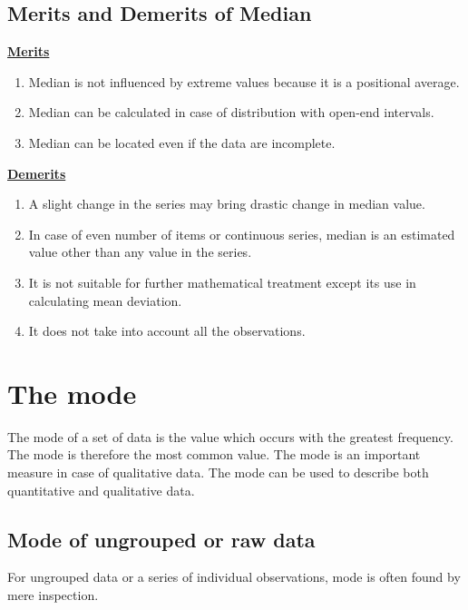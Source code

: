 \documentclass[
]{book}
\begin{document}
\subsection{Merits and Demerits of Median}\label{merits-and-demerits-of-median}

\ul{\textbf{Merits}}

\begin{enumerate}
\def\labelenumi{\arabic{enumi}.}
\item
  Median is not influenced by extreme values because it is a
  positional average.
\item
  Median can be calculated in case of distribution with open-end
  intervals.
\item
  Median can be located even if the data are incomplete.
\end{enumerate}

\ul{\textbf{Demerits}}

\begin{enumerate}
\def\labelenumi{\arabic{enumi}.}
\item
  A slight change in the series may bring drastic change in median
  value.
\item
  In case of even number of items or continuous series, median is an
  estimated value other than any value in the series.
\item
  It is not suitable for further mathematical treatment except its use
  in calculating mean deviation.
\item
  It does not take into account all the observations.
\end{enumerate}

\section{The mode}\label{the-mode}

The mode of a set of data is the value which occurs with the greatest
frequency. The mode is therefore the most common value. The mode is an
important measure in case of qualitative data. The mode can be used to
describe both quantitative and qualitative data.

\subsection{Mode of ungrouped or raw data}\label{mode-of-ungrouped-or-raw-data}

For ungrouped data or a series of individual observations, mode is often
found by mere inspection.
\end{document}
